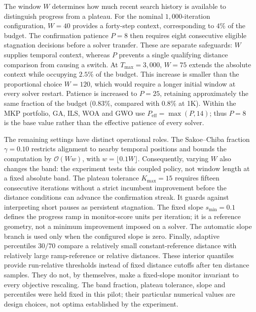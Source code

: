\documentclass[review]{elsarticle}
\begin{document}
The window $W$ determines how much recent search history is available to
distinguish progress from a plateau. For the nominal $1{,}000$-iteration
configuration, $W=40$ provides a forty-step context, corresponding to
$4\%$ of the budget. The confirmation patience $P=8$ then requires eight
consecutive eligible stagnation decisions before a solver transfer.
These are separate safeguards: $W$ supplies temporal context, whereas $P$
prevents a single qualifying distance comparison from causing a switch.
At $T_{\max}=3{,}000$, $W=75$ extends the absolute context while occupying
$2.5\%$ of the budget. This increase is smaller than the proportional
choice $W=120$, which would require a longer initial window at every
solver restart. Patience is increased to $P=25$, retaining approximately
the same fraction of the budget ($0.83\%$, compared with $0.8\%$ at 1K).
Within the MKP portfolio, GA, ILS, WOA and GWO use
$P_{\mathrm{eff}}=\max(P,14)$; thus $P=8$ is the base value rather than
the effective patience of every solver.

The remaining settings have distinct operational roles. The
Sakoe--Chiba fraction $\gamma=0.10$ restricts alignment to nearby temporal
positions and bounds the computation by $\mathcal{O}(Ww)$, with
$w=\lfloor0.1W\rfloor$. Consequently, varying $W$ also changes the band:
the experiment tests this coupled policy, not window length at a fixed
absolute band. The plateau tolerance $K_{\max}=15$ requires fifteen
consecutive iterations without a strict incumbent improvement before
the distance conditions can advance the confirmation streak. It guards
against interpreting short pauses as persistent stagnation. The fixed
slope $s_{\min}=0.1$ defines the progress ramp in monitor-score units per
iteration; it is a reference geometry, not a minimum improvement imposed
on a solver. The automatic slope branch is used only when the configured
slope is zero. Finally, adaptive percentiles $30/70$ compare a relatively
small constant-reference distance with relatively large ramp-reference
or relative distances. These interior quantiles provide run-relative
thresholds instead of fixed distance cutoffs after ten distance samples.
They do not, by themselves, make a fixed-slope monitor invariant to every
objective rescaling. The band fraction, plateau tolerance, slope and
percentiles were held fixed in this pilot; their particular numerical
values are design choices, not optima established by the experiment.
\end{document}
